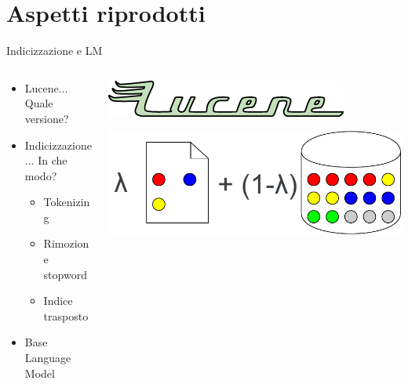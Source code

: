 \section{Aspetti riprodotti}
\begin{frame}{Indicizzazione e LM}
    \begin{columns}
        \begin{column}{0.5\textwidth}
            \begin{itemize}
                \item Lucene... Quale versione?
            \end{itemize}
            \bigskip
            \begin{itemize}
                \item Indicizzazione... In che modo?
                      \begin{itemize}
                          \item Tokenizing
                          \item Rimozione stopword
                          \item Indice trasposto
                      \end{itemize}
            \end{itemize}
            \bigskip
            \begin{itemize}
                \item Base Language Model
            \end{itemize}
        \end{column}
        \begin{column}{0.5\textwidth}

            \bigskip
            \includegraphics[width=\columnwidth]{img/lucene_logo.png}

            \bigskip
            \bigskip
            \bigskip
            \bigskip
            \bigskip
            \bigskip
            \includegraphics[width=\columnwidth]{img/lm.pdf}
        \end{column}
    \end{columns}
\end{frame}

